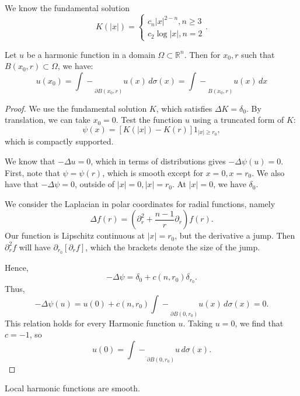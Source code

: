 \documentclass[12pt]{scrartcl}
\newcommand{\R}{\mathbb{R}}
\newcommand{\aint}{\mathrel{\int\!\!\!\!\!\!-}}
\begin{document}
We know the fundamental solution
$$K(|x|) = \begin{cases}
c_n |x|^{2-n}, n \ge 3\\
c_2 \log |x|, n = 2
\end{cases}.$$
\begin{theorem} Let $u$ be a harmonic function in a domain $\Omega \subset \R^n$.  Then for $x_0, r$ such that $B(x_0, r) \subset \Omega$, we have:
$$u(x_0) = \aint_{\partial B(x_0, r)} u(x) \,d\sigma(x) = \aint_{B(x_0, r)} u(x) \,dx$$
\end{theorem}
\begin{proof}
We use the fundamental solution $K$, which satisfies $\Delta K = \delta_0$.  By translation, we can take $x_0 = 0$.  Test the function $u$ using a truncated form of $K$:
$$\psi(x) =[K(|x|) - K(r)]1_{|x| \ge r_0},$$
which is compactly supported.

We know that $-\Delta u = 0$, which in terms of distributions gives $-\Delta \psi(u) = 0$.  First, note that $\psi = \psi(r)$, which is smooth except for $x=0, x= r_0$. We also have that $- \Delta \psi = 0$, outside of $|x| = 0, |x| = r_0$.  At $|x| = 0$, we have $\delta_0$.

We consider the Laplacian in polar coordinates for radial functions, namely
$$\Delta f(r) = (\partial_r^2 + \frac{n-1}{r} \partial_r)f(r).$$
Our function is Lipschitz continuous at $|x| = r_0$, but the derivative a jump.  Then $\partial_r^2 f$ will have $\partial_{r_0}[\partial_r f]$, which the brackets denote the size of the jump.

Hence,
$$-\Delta \psi = \delta_0 + c(n, r_0) \delta_{r_0}.$$
Thus,
$$-\Delta \psi(u) = u(0) + c(n, r_0)\aint_{\partial B(0, r_0)} u(x)\, d\sigma(x)= 0.$$
This relation holds for every Harmonic function $u$.  Taking $u = 0$, we find that $c = -1$, so 
$$u(0) = \aint_{\partial B(0, r_0)} u\, d\sigma(x).$$
\end{proof}
\begin{theorem} Local harmonic functions are smooth.
\end{theorem}
\end{document}
